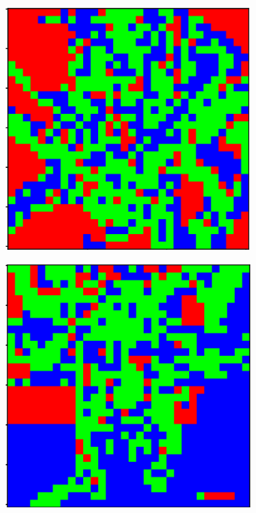 \documentclass{aci}
\numberwithin{equation}{section}
\begin{document}
\begin{figure}
    \begin{subfigure}{\segmentedsubwidth}
        \includegraphics[width=1\linewidth]{figs/19/r103.png}
    \end{subfigure}
    \begin{subfigure}{\segmentedsubwidth}
        \includegraphics[width=1\linewidth]{figs/19/r111.png}

\end{subfigure}
\end{figure}
\end{document}
